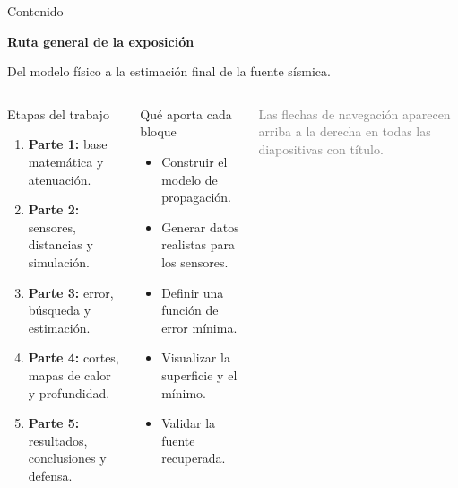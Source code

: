 \documentclass[aspectratio=169]{beamer}
\begin{document}
\begin{frame}
    \titlepage
\end{frame}

\begin{frame}{Contenido}
    \vspace{0.05cm}
    \begin{center}
        {\Large\textbf{Ruta general de la exposición}}

        \vspace{0.15cm}
        \small
        Del modelo físico a la estimación final de la fuente sísmica.
    \end{center}

    \vspace{0.1cm}

    \begin{columns}[T,onlytextwidth]
        \begin{block}{Etapas del trabajo}
            \begin{enumerate}
                \item \textbf{Parte 1:} base matemática y atenuación.
                \item \textbf{Parte 2:} sensores, distancias y simulación.
                \item \textbf{Parte 3:} error, búsqueda y estimación.
                \item \textbf{Parte 4:} cortes, mapas de calor y profundidad.
                \item \textbf{Parte 5:} resultados, conclusiones y defensa.
            \end{enumerate}
        \end{block}

        \begin{exampleblock}{Qué aporta cada bloque}
            \footnotesize
            \begin{itemize}
                \item Construir el modelo de propagación.
                \item Generar datos realistas para los sensores.
                \item Definir una función de error mínima.
                \item Visualizar la superficie y el mínimo.
                \item Validar la fuente recuperada.
            \end{itemize}
        \end{exampleblock}

        \vspace{0.05cm}

        \begin{center}
            \scriptsize\textcolor{gray}{Las flechas de navegación aparecen arriba a la derecha en todas las diapositivas con título.}
        \end{center}
    \end{columns}
\end{frame}
\end{document}
